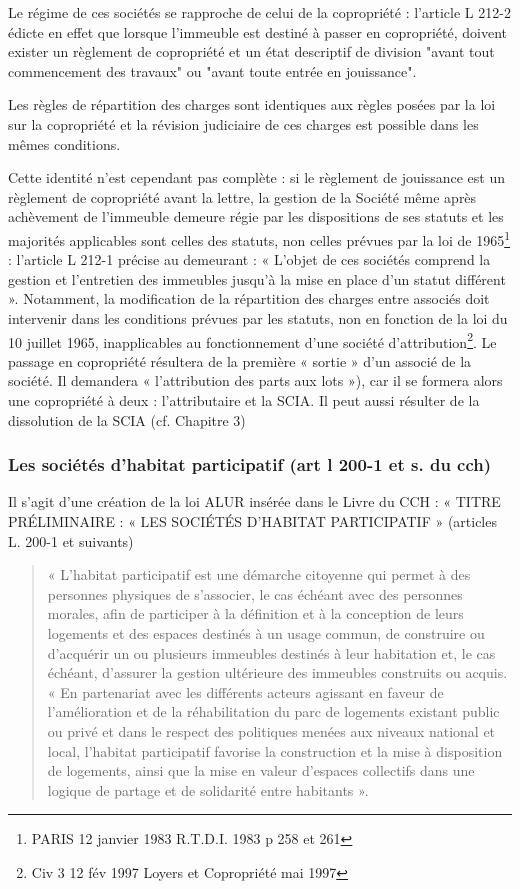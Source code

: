 			Le régime de ces sociétés se rapproche de celui de la copropriété : l'article L 212-2 édicte en effet que
			lorsque l'immeuble est destiné à passer en copropriété, doivent exister un règlement de copropriété et un
			état descriptif de division "avant tout commencement des travaux" ou "avant toute entrée en jouissance".
			
			Les règles de répartition des charges sont identiques aux règles posées par la loi sur la copropriété et la
			révision judiciaire de ces charges est possible dans les mêmes conditions.
			
			Cette identité n'est cependant pas complète : si le règlement de jouissance est un règlement de
			copropriété avant la lettre, la gestion de la Société même après achèvement de l'immeuble demeure régie
			par les dispositions de ses statuts et les majorités applicables sont celles des statuts, non celles prévues
			par la loi de 1965\footnote{PARIS 12 janvier 1983 R.T.D.I. 1983 p 258 et 261} : l’article L 212-1 précise au demeurant : « L’objet de ces sociétés comprend la gestion
			et l’entretien des immeubles jusqu’à la mise en place d’un statut différent ».
			Notamment, la modification de la répartition des charges entre associés doit intervenir dans les conditions
			prévues par les statuts, non en fonction de la loi du 10 juillet 1965, inapplicables au fonctionnement d’une
			société d’attribution\footnote{Civ 3\degre{} 12 fév 1997 Loyers et Copropriété mai 1997 }.
			Le passage en copropriété résultera de la première « sortie » d’un associé de la société. Il demandera
			« l’attribution des parts aux lots »), car il se formera alors une copropriété à deux : l’attributaire et la SCIA.
			Il peut aussi résulter de la dissolution de la SCIA (cf. Chapitre 3)
		
		\subsubsection{Les sociétés d’habitat participatif (art l 200-1 et s. du cch)}
	
		Il s’agit d’une création de la loi ALUR insérée dans le Livre \II{} du CCH : « TITRE PRÉLIMINAIRE : « LES
		SOCIÉTÉS D'HABITAT PARTICIPATIF » (articles L. 200-1 et suivants)
		\begin{quote}
			« L'habitat participatif est une démarche citoyenne qui permet à des personnes physiques de s'associer,
			le cas échéant avec des personnes morales, afin de participer à la définition et à la conception de leurs
			logements et des espaces destinés à un usage commun, de construire ou d'acquérir un ou plusieurs
			immeubles destinés à leur habitation et, le cas échéant, d'assurer la gestion ultérieure des immeubles
			construits ou acquis.
			« En partenariat avec les différents acteurs agissant en faveur de l'amélioration et de la réhabilitation du
			parc de logements existant public ou privé et dans le respect des politiques menées aux niveaux national
			et local, l'habitat participatif favorise la construction et la mise à disposition de logements, ainsi que la
			mise en valeur d'espaces collectifs dans une logique de partage et de solidarité entre habitants ».
		\end{quote}
		

